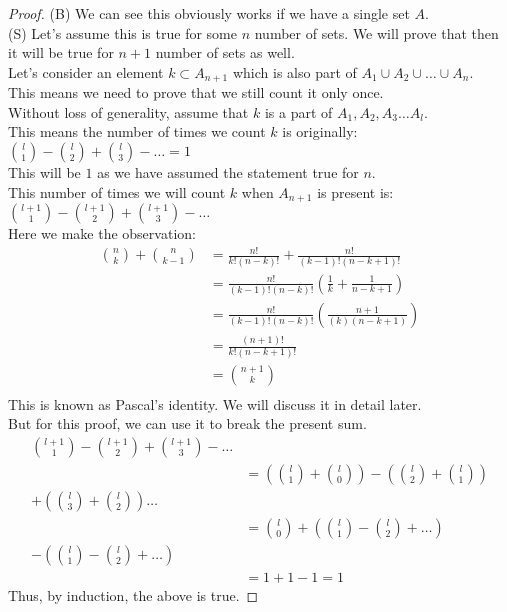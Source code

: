 \begin{proof}
    (B) We can see this obviously works if we have a single set $A$.\\
    (S) Let's assume this is true for some $n$ number of sets. We will prove that then it will be true for $n+1$ number of sets as well.\\
    Let's consider an element $k \subset A_{n+1}$ which is also part of $A_1 \cup A_2 \cup \dots \cup A_n$.\\
    This means we need to prove that we still count it only once.\\
    Without loss of generality, assume that $k$ is a part of $A_1, A_2, A_3 \dots A_l$.\\
    This means the number of times we count $k$ is originally:\\
    $\binom{l}{1}-\binom{l}{2}+\binom{l}{3}-\dots=1$\\
    This will be $1$ as we have assumed the statement true for $n$.\\
    This number of times we will count $k$ when $A_{n+1}$ is present is:\\
    $\binom{l+1}{1}-\binom{l+1}{2}+\binom{l+1}{3}-\dots$\\
    Here we make the observation:\\
    \begin{align*}
        \binom{n}{k}+\binom{n}{k-1} & = \frac{n!}{k!(n-k)!}+ \frac{n!}{(k-1)!(n-k+1)!}\\
        & = \frac{n!}{(k-1)!(n-k)!}\left( \frac{1}{k}+\frac{1}{n-k+1} \right)\\
        & = \frac{n!}{(k-1)!(n-k)!}\left( \frac{n+1}{(k)(n-k+1)} \right)\\
        & = \frac{(n+1)!}{k!(n-k+1)!}\\
        & = \binom{n+1}{k}\\
    \end{align*}
    This is known as Pascal's identity. We will discuss it in detail later.\\
    But for this proof, we can use it to break the present sum.\\
\begin{align*}
\binom{l+1}{1}-\binom{l+1}{2}+\binom{l+1}{3}-\dots & \\
&= \left(\binom{l}{1}+\binom{l}{0}\right)-\left(\binom{l}{2}+\binom{l}{1}\right)\\
+\left(\binom{l}{3}+\binom{l}{2}\right)\dots\\
&= \binom{l}{0}+\left( \binom{l}{1}-\binom{l}{2}+\dots \right)\\
-\left( \binom{l}{1}-\binom{l}{2}+\dots \right)\\
&= 1+1-1=1
\end{align*}
Thus, by induction, the above is true.
\end{proof}
